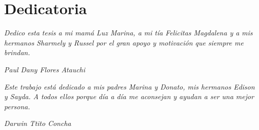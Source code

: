\chapter*{Dedicatoria}

\textit{Dedico esta tesis a mi mamá Luz Marina, a mi tía Felicitas Magdalena y a mis hermanos Sharmely y Russel por el gran apoyo y motivación que siempre me brindan.} 
\begin{flushright}\textit{Paul Dany Flores Atauchi}\end{flushright}

\vspace{1cm}
\textit{Este trabajo está dedicado a mis padres Marina y Donato, mis hermanos Edison y Sayda. A todos ellos porque día a día me aconsejan y ayudan a ser una mejor persona.}
\begin{flushright}\textit{Darwin Ttito Concha}\end{flushright}

